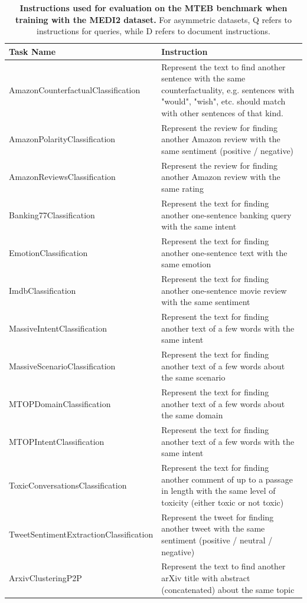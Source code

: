 \documentclass{article}
\begin{document}
\setlength\extrarowheight{5pt}
\begin{longtable}{lp{9cm}}
\caption{\textbf{Instructions used for evaluation on the MTEB benchmark when training with the MEDI2 dataset.} For asymmetric datasets, Q refers to instructions for queries, while D refers to document instructions.} \\
\toprule
Task Name & Instruction \\
\midrule
AmazonCounterfactualClassification & Represent the text to find another sentence with the same counterfactuality, e.g. sentences with "would", "wish", etc. should match with other sentences of that kind. \\
AmazonPolarityClassification & Represent the review for finding another Amazon review with the same sentiment (positive / negative) \\
AmazonReviewsClassification & Represent the review for finding another Amazon review with the same rating \\
Banking77Classification & Represent the text for finding another one-sentence banking query with the same intent \\
EmotionClassification & Represent the text for finding another one-sentence text with the same emotion \\
ImdbClassification & Represent the text for finding another one-sentence movie review with the same sentiment \\
MassiveIntentClassification & Represent the text for finding another text of a few words with the same intent \\
MassiveScenarioClassification & Represent the text for finding another text of a few words about the same scenario \\
MTOPDomainClassification & Represent the text for finding another text of a few words about the same domain \\
MTOPIntentClassification & Represent the text for finding another text of a few words with the same intent \\
ToxicConversationsClassification & Represent the text for finding another comment of up to a passage in length with the same level of toxicity (either toxic or not toxic) \\
TweetSentimentExtractionClassification & Represent the tweet for finding another tweet with the same sentiment (positive / neutral / negative) \\
\midrule
ArxivClusteringP2P & Represent the text to find another arXiv title with abstract (concatenated) about the same topic \\

\end{longtable}
\end{document}
